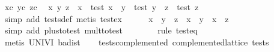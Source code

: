 \begin{isabellebody}
\ xc\ yc\ zc\ \isamarkupfalse%
\ x{}\ y{}\ z{}\ \ {}x\ {}\ test\ x{}{}\ \ {}y\ {}\ test\ y{}{}\ \ {}z\ {}\ test\ z{}{}\isanewline
\ \ \ \ \ \ \isamarkupfalse%
\ {}simp\ add{}\ tests{}def{}\ metis\ test{}ex{}\isanewline
\ \ \ \ \isamarkupfalse%
\ {}x\ {}\ y\ {}\ z\ {}\ {}x\ {}\ y{}\ {}\ {}x\ {}\ z{}{}\isanewline
\ \ \ \ \ \ \isamarkupfalse%
\ {}simp\ add{}\ plus{}to{}test\ mult{}to{}test{}\isanewline
\ \ \ \ \ \ \isamarkupfalse%
\ {}rule\ test{}eq{}\isanewline
\ \ \ \ \ \ \isamarkupfalse%
\ {}metis\ UNIV{}I\ ba{}dist{}{}\isanewline
\ \ \isamarkupfalse%
\isanewline
{}\isamarkupfalse%
%
\endisatagproof
{\isafoldproof}%
%
\isadelimproof
\isanewline
%
\endisadelimproof
\isanewline
{}\isamarkupfalse%
\ tests{}complemented{}\ {}complemented{}lattice\ tests{}\isanewline

\end{isabellebody}

